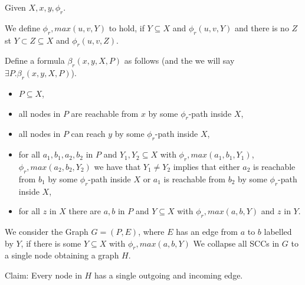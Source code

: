 Given $X,x,y,\phi_r$.

We define $\phi_r,{max}(u,v,Y)$ to hold, if $Y \subseteq X$ and $\phi_r(u,v,Y)$ and there is no $Z$ st $Y \subset Z \subseteq X$ and $\phi_r(u,v,Z)$.

Define a formula $\beta_r(x,y,X,P)$ as follows (and the we will say $\exists P. \beta_r(x,y,X,P)$).

\begin{itemize}
\item $P \subseteq X$,
\item all nodes in $P$ are reachable from $x$ by some $\phi_r$-path inside $X$,
\item all nodes in $P$ can reach $y$ by some $\phi_r$-path inside $X$,
\item for all $a_1,b_1,a_2,b_2$ in $P$ and $Y_1, Y_2 \subseteq X$ with $\phi_r,max(a_1,b_1,Y_1)$,
  $\phi_r,max(a_2,b_2,Y_2)$ we have that $Y_1 \neq Y_2$ implies that either $a_2$ is reachable
from $b_1$ by some $\phi_r$-path inside $X$ or $a_1$ is reachable from $b_2$ by some
$\phi_r$-path inside $X$,
\item for all $z$ in $X$ there are $a,b$ in $P$ and $Y \subseteq X$ with $\phi_r,max(a,b,Y)$ and
  $z$ in $Y$.
  \end{itemize}
  

We consider the Graph $G = (P,E)$, where $E$ has an edge from $a$ to $b$ labelled by $Y$,
if there is some $Y \subseteq X$ with $\phi_r,max(a,b,Y)$
We collapse all SCCs in $G$ to a single node obtaining a graph $H$.

Claim: Every node in $H$ has a single outgoing and incoming edge.